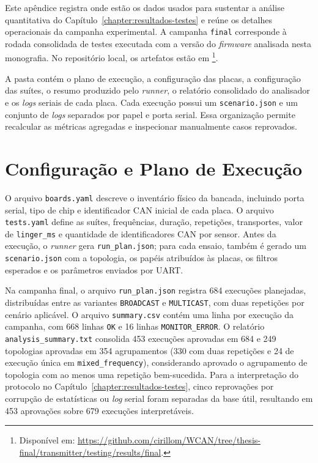 Este apêndice registra onde estão os dados usados para sustentar a análise
quantitativa do Capítulo~\ref{chapter:resultados-testes} e reúne os detalhes
operacionais da campanha experimental. A campanha \texttt{final} corresponde à
rodada consolidada de testes executada com a versão do \emph{firmware} analisada
nesta monografia. No repositório local, os artefatos estão em
\footnote{Disponível em:
\url{https://github.com/cirillom/WCAN/tree/thesis-final/transmitter/testing/results/final}.}.

A pasta contém o plano de execução, a configuração das placas, a configuração das
suítes, o resumo produzido pelo \emph{runner}, o relatório consolidado do
analisador e os \emph{logs} seriais de cada placa. Cada execução possui um
\texttt{scenario.json} e um conjunto de \emph{logs} separados por papel e porta
serial. Essa organização permite recalcular as métricas agregadas e inspecionar
manualmente casos reprovados.

\section{Configuração e Plano de Execução}

O arquivo \texttt{boards.yaml} descreve o inventário físico da bancada, incluindo
porta serial, tipo de chip e identificador CAN inicial de cada placa. O arquivo
\texttt{tests.yaml} define as suítes, frequências, duração, repetições,
transportes, valor de \texttt{linger\_ms} e quantidade de identificadores CAN por
sensor. Antes da execução, o \emph{runner} gera \texttt{run\_plan.json}; para
cada ensaio, também é gerado um \texttt{scenario.json} com a topologia, os papéis
atribuídos às placas, os filtros esperados e os parâmetros enviados por UART.

Na campanha final, o arquivo \texttt{run\_plan.json} registra 684 execuções
planejadas, distribuídas entre as variantes \texttt{BROADCAST} e
\texttt{MULTICAST}, com duas repetições por cenário aplicável. O arquivo
\texttt{summary.csv} contém uma linha por execução da campanha, com 668 linhas
\texttt{OK} e 16 linhas \texttt{MONITOR\_ERROR}. O relatório
\texttt{analysis\_summary.txt} consolida 453 execuções aprovadas em 684 e 249
topologias aprovadas em 354 agrupamentos (330 com duas repetições e 24 de
execução única em \texttt{mixed\_frequency}), considerando aprovado o agrupamento
de topologia com ao menos uma repetição bem-sucedida. Para a interpretação do
protocolo no Capítulo~\ref{chapter:resultados-testes}, cinco reprovações por
corrupção de estatísticas ou \emph{log} serial foram separadas da base útil,
resultando em 453 aprovações sobre 679 execuções interpretáveis.

